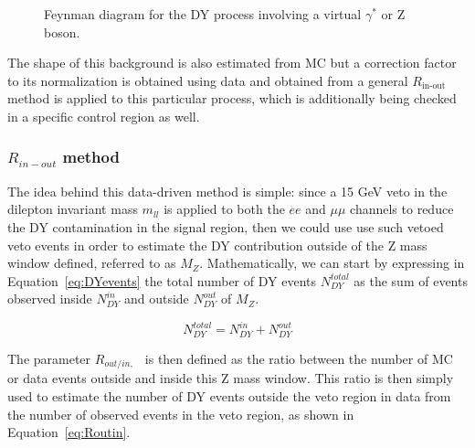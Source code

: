 \documentclass[a4paper, 10pt, openright]{report}
\begin{document}
\begin{figure}[htbp]
\centering
\begin{minipage}[b]{.34\textwidth}
\end{minipage} 
\caption{Feynman diagram for the \ac{DY} process involving a virtual $\gamma^*$ or Z boson.}
\label{fig:DY}
\end{figure}

The shape of this background is also estimated from \ac{MC} but a correction factor to its normalization is obtained using data and obtained from a general $R_{\text{in-out}}$ method is applied to this particular process, which is additionally being checked in a specific control region as well.

\subsubsection{$R_{in-out}$ method} \label{subsection:rinout}

The idea behind this data-driven method is simple: since a 15 GeV veto in the dilepton invariant mass $m_{ll}$ is applied to both the $ee$ and $\mu \mu$ channels to reduce the \ac{DY} contamination in the signal region, then we could use use such vetoed veto events in order to estimate the \ac{DY} contribution outside of the Z mass window defined, referred to as $M_Z$. Mathematically, we can start by expressing in Equation~\ref{eq:DYevents} the total number of \ac{DY} events $N_{DY}^{total}$ as the sum of events observed inside $N_{DY}^{in}$ and outside $N_{DY}^{out}$ of $M_Z$.

\begin{equation}
\label{eq:DYevents}
N_{DY}^{total} = N_{DY}^{in} + N_{DY}^{out}
\end{equation}

The parameter $R_{out/in,\text{ }}$ is then defined as the ratio between the number of \ac{MC} or data events outside and inside this Z mass window. This ratio is then simply used to estimate the number of DY events outside the veto region in data from the number of observed events in the veto region, as shown in Equation~\ref{eq:Routin}.
\end{document}
